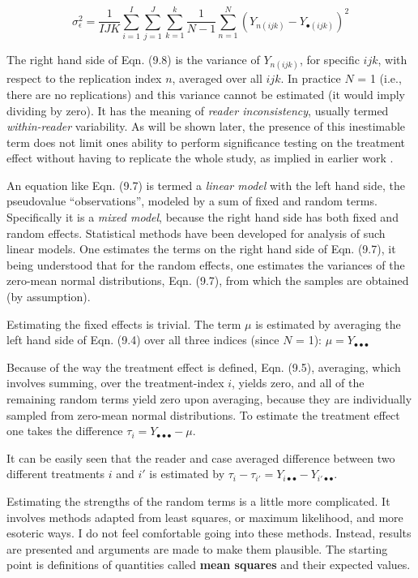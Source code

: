 \documentclass[
]{book}
\begin{document}
\begin{equation}
\sigma_{\epsilon}^{2}=\frac{1}{IJK}\sum_{i=1}^{I}\sum_{j=1}^{J}\sum_{k=1}^{k}\frac{1}{N-1}\sum_{n=1}^{N}\left ( Y_{n(ijk)} - Y_{\bullet (ijk)} \right )^2
\label{eq:EstimatingEpsilon}
\end{equation}

The right hand side of Eqn. (9.8) is the variance of \(Y_{n(ijk)}\), for specific \(ijk\), with respect to the replication index \(n\), averaged over all \(ijk\). In practice \(N\) = 1 (i.e., there are no replications) and this variance cannot be estimated (it would imply dividing by zero). It has the meaning of \emph{reader inconsistency}, usually termed \emph{within-reader} variability. As will be shown later, the presence of this inestimable term does not limit ones ability to perform significance testing on the treatment effect without having to replicate the whole study, as implied in earlier work \citep{RN1450}.

An equation like Eqn. (9.7) is termed a \emph{linear model} with the left hand side, the pseudovalue ``observations'', modeled by a sum of fixed and random terms. Specifically it is a \emph{mixed model}, because the right hand side has both fixed and random effects. Statistical methods have been developed for analysis of such linear models. One estimates the terms on the right hand side of Eqn. (9.7), it being understood that for the random effects, one estimates the variances of the zero-mean normal distributions, Eqn. (9.7), from which the samples are obtained (by assumption).

Estimating the fixed effects is trivial. The term \(\mu\) is estimated by averaging the left hand side of Eqn. (9.4) over all three indices (since \(N\) = 1): \(\mu=Y_{\bullet \bullet \bullet}\)

Because of the way the treatment effect is defined, Eqn. (9.5), averaging, which involves summing, over the treatment-index \(i\), yields zero, and all of the remaining random terms yield zero upon averaging, because they are individually sampled from zero-mean normal distributions. To estimate the treatment effect one takes the difference \(\tau_i=Y_{\bullet \bullet \bullet}-\mu\).

It can be easily seen that the reader and case averaged difference between two different treatments \(i\) and \(i'\) is estimated by \(\tau_i-\tau_{i'} = Y_{i \bullet \bullet} - Y_{i' \bullet \bullet}\).

Estimating the strengths of the random terms is a little more complicated. It involves methods adapted from least squares, or maximum likelihood, and more esoteric ways. I do not feel comfortable going into these methods. Instead, results are presented and arguments are made to make them plausible. The starting point is definitions of quantities called \textbf{mean squares} and their expected values.
\end{document}
